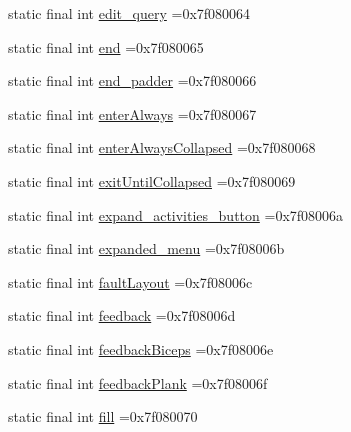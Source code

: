 \begin{DoxyCompactItemize}
\item 
static final int \mbox{\hyperlink{classcom_1_1example_1_1trainawearapplication_1_1_r_1_1id_a4b7d45c3566136f38abed2c7ba5470f2}{edit\+\_\+query}} =0x7f080064
\item 
static final int \mbox{\hyperlink{classcom_1_1example_1_1trainawearapplication_1_1_r_1_1id_ab29d061aa1220df65ffdaee55a2a8b92}{end}} =0x7f080065
\item 
static final int \mbox{\hyperlink{classcom_1_1example_1_1trainawearapplication_1_1_r_1_1id_a89bf5594a372c63a5df06eac2c019fab}{end\+\_\+padder}} =0x7f080066
\item 
static final int \mbox{\hyperlink{classcom_1_1example_1_1trainawearapplication_1_1_r_1_1id_a413067003fb1f5dbedf33f521adb448b}{enter\+Always}} =0x7f080067
\item 
static final int \mbox{\hyperlink{classcom_1_1example_1_1trainawearapplication_1_1_r_1_1id_a897ccaa77b238fb23ff35bef2a1cc519}{enter\+Always\+Collapsed}} =0x7f080068
\item 
static final int \mbox{\hyperlink{classcom_1_1example_1_1trainawearapplication_1_1_r_1_1id_a9179f11942bb2b12088e5f645894296d}{exit\+Until\+Collapsed}} =0x7f080069
\item 
static final int \mbox{\hyperlink{classcom_1_1example_1_1trainawearapplication_1_1_r_1_1id_a3d6af4d86951c2ad91dbffea53d193c2}{expand\+\_\+activities\+\_\+button}} =0x7f08006a
\item 
static final int \mbox{\hyperlink{classcom_1_1example_1_1trainawearapplication_1_1_r_1_1id_a0a22a8b2d2c6cb64c8648bb14ccf0687}{expanded\+\_\+menu}} =0x7f08006b
\item 
static final int \mbox{\hyperlink{classcom_1_1example_1_1trainawearapplication_1_1_r_1_1id_a61948a296df8c55f8744c7b159865f8c}{fault\+Layout}} =0x7f08006c
\item 
static final int \mbox{\hyperlink{classcom_1_1example_1_1trainawearapplication_1_1_r_1_1id_a49a1ec14ba404200858ae65cd943dc51}{feedback}} =0x7f08006d
\item 
static final int \mbox{\hyperlink{classcom_1_1example_1_1trainawearapplication_1_1_r_1_1id_a21482ba55a776d6d7ff586d43b728cf4}{feedback\+Biceps}} =0x7f08006e
\item 
static final int \mbox{\hyperlink{classcom_1_1example_1_1trainawearapplication_1_1_r_1_1id_a4a49531b46a14e2ebfa83ef2568b4da0}{feedback\+Plank}} =0x7f08006f
\item 
static final int \mbox{\hyperlink{classcom_1_1example_1_1trainawearapplication_1_1_r_1_1id_ac53bd4cb9a5ea00b0086475e80f266bd}{fill}} =0x7f080070

\end{DoxyCompactItemize}

